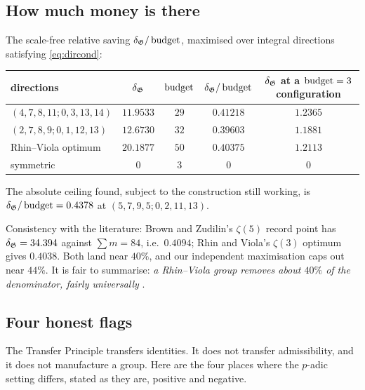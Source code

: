 \subsection{How much money is there}\label{ss:howmuch}

\begin{finding}\label{find:howmuch}
The scale-free relative saving $\delta_{\mathfrak{G}}/\operatorname{budget}$, maximised over integral directions
satisfying \eqref{eq:dircond}:
\begin{center}
\tabsmall
\begin{tabular}{lcccc}
\toprule
directions & $\delta_{\mathfrak{G}}$ & $\operatorname{budget}$ & $\delta_{\mathfrak{G}}/\operatorname{budget}$ & $\delta_{\mathfrak{G}}$ at a $\operatorname{budget}=3$ configuration\\
\midrule
$(4,7,8,11;0,3,13,14)$ & $11.9533$ & $29$ & $0.41218$ & $1.2365$\\
$(2,7,8,9;0,1,12,13)$ & $12.6730$ & $32$ & $0.39603$ & $1.1881$\\
Rhin--Viola optimum & $20.1877$ & $50$ & $0.40375$ & $1.2113$\\
symmetric & $0$ & $3$ & $0$ & $0$\\
\bottomrule
\end{tabular}
\end{center}
The absolute ceiling found, subject to the construction still working, is
$\delta_{\mathfrak{G}}/\operatorname{budget}=0.4378$ at $(5,7,9,5;0,2,11,13)$.
\end{finding}

Consistency with the literature: Brown and Zudilin's $\zeta(5)$ record point has
$\delta_{\mathfrak{G}}=34.394$ against $\sum m=84$, i.e.\ $0.4094$; Rhin and Viola's $\zeta(3)$ optimum gives
$0.4038$. Both land near $40\%$, and our independent maximisation caps out near $44\%$. It
is fair to summarise: \emph{a Rhin--Viola group removes about $40\%$ of the denominator,
fairly universally} .

\subsection{Four honest flags}\label{ss:flags}

The Transfer Principle transfers identities. It does not transfer admissibility, and it does
not manufacture a group. Here are the four places where the $p$-adic setting differs, stated
as they are, positive and negative.

